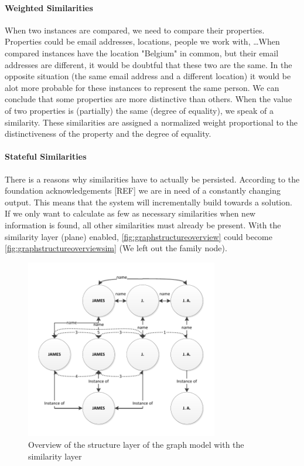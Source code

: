\paragraph{Weighted Similarities} When two instances are compared, we need to compare their properties. Properties could be email addresses, locations, people we work with, \ldots When compared instances have the location "Belgium" in common, but their email addresses are different, it would be doubtful that these two are the same. In the opposite situation (the same email address and a different location) it would be alot more probable for these instances to represent the same person. We can conclude that some properties are more distinctive than others. When the value of two properties is (partially) the same (degree of equality), we speak of a similarity. These similarities are assigned a normalized weight proportional to the distinctiveness of the property and the degree of equality.

\paragraph{Stateful Similarities} There is a reasons why similarities have to actually be persisted. According to the foundation acknowledgements [REF] we are in need of a constantly changing output. This means that the system will incrementally build towards a solution. If we only want to calculate as few as necessary similarities when new information is found, all other similarities must already be present. With the similarity layer (plane) enabled, \autoref{fig:graphstructureoverview} could become \autoref{fig:graphstructureoverviewsim} (We left out the family node).

\begin{figure}[htb]
	\centering
		\includegraphics[width=0.75\textwidth]{fig/graphstructureoverviewsim}
	\caption{Overview of the structure layer of the graph model with the similarity layer}
	\label{fig:graphstructureoverviewsim}
\end{figure}

